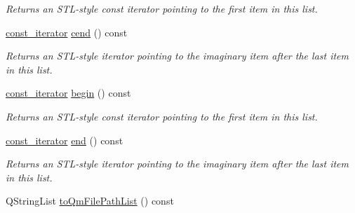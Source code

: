 \begin{DoxyCompactItemize}
\begin{DoxyCompactList}\small\item\em Returns an S\+T\+L-\/style const iterator pointing to the first item in this list. \end{DoxyCompactList}\item 
\hyperlink{class_mdt_1_1_translation_1_1_translation_info_list_a9e4747d959b7b20fc6e60d62552dc93e}{const\+\_\+iterator} \hyperlink{class_mdt_1_1_translation_1_1_translation_info_list_a34a73ffb604bcee16cde3593cd0e6746}{cend} () const \hypertarget{class_mdt_1_1_translation_1_1_translation_info_list_a34a73ffb604bcee16cde3593cd0e6746}{}\label{class_mdt_1_1_translation_1_1_translation_info_list_a34a73ffb604bcee16cde3593cd0e6746}

\begin{DoxyCompactList}\small\item\em Returns an S\+T\+L-\/style iterator pointing to the imaginary item after the last item in this list. \end{DoxyCompactList}\item 
\hyperlink{class_mdt_1_1_translation_1_1_translation_info_list_a9e4747d959b7b20fc6e60d62552dc93e}{const\+\_\+iterator} \hyperlink{class_mdt_1_1_translation_1_1_translation_info_list_aef587b24332c8fbea6512c3ac66e56f2}{begin} () const \hypertarget{class_mdt_1_1_translation_1_1_translation_info_list_aef587b24332c8fbea6512c3ac66e56f2}{}\label{class_mdt_1_1_translation_1_1_translation_info_list_aef587b24332c8fbea6512c3ac66e56f2}

\begin{DoxyCompactList}\small\item\em Returns an S\+T\+L-\/style const iterator pointing to the first item in this list. \end{DoxyCompactList}\item 
\hyperlink{class_mdt_1_1_translation_1_1_translation_info_list_a9e4747d959b7b20fc6e60d62552dc93e}{const\+\_\+iterator} \hyperlink{class_mdt_1_1_translation_1_1_translation_info_list_a015c12e9158f63a709199e9a7f123dc3}{end} () const \hypertarget{class_mdt_1_1_translation_1_1_translation_info_list_a015c12e9158f63a709199e9a7f123dc3}{}\label{class_mdt_1_1_translation_1_1_translation_info_list_a015c12e9158f63a709199e9a7f123dc3}

\begin{DoxyCompactList}\small\item\em Returns an S\+T\+L-\/style iterator pointing to the imaginary item after the last item in this list. \end{DoxyCompactList}\item 
Q\+String\+List \hyperlink{class_mdt_1_1_translation_1_1_translation_info_list_a095b20704c54d7fab97fd9dfb7196f3d}{to\+Qm\+File\+Path\+List} () const \hypertarget{class_mdt_1_1_translation_1_1_translation_info_list_a095b20704c54d7fab97fd9dfb7196f3d}{}\label{class_mdt_1_1_translation_1_1_translation_info_list_a095b20704c54d7fab97fd9dfb7196f3d}


\end{DoxyCompactItemize}
